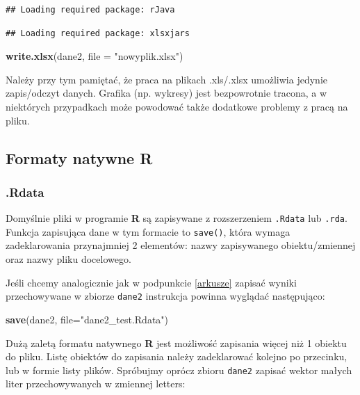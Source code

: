 \documentclass[]{book}
\newenvironment{Shaded}{\begin{snugshade}}{\end{snugshade}}
\newcommand{\KeywordTok}[1]{\textcolor[rgb]{0.13,0.29,0.53}{\textbf{#1}}}
\newcommand{\DataTypeTok}[1]{\textcolor[rgb]{0.13,0.29,0.53}{#1}}
\newcommand{\StringTok}[1]{\textcolor[rgb]{0.31,0.60,0.02}{#1}}
\newcommand{\NormalTok}[1]{#1}
\theoremstyle{definition}
\theoremstyle{definition}
\theoremstyle{definition}
\theoremstyle{remark}
\begin{document}
\begin{verbatim}
## Loading required package: rJava
\end{verbatim}

\begin{verbatim}
## Loading required package: xlsxjars
\end{verbatim}

\begin{Shaded}
\begin{Highlighting}[]
\KeywordTok{write.xlsx}\NormalTok{(dane2, }\DataTypeTok{file =} \StringTok{"nowyplik.xlsx"}\NormalTok{)}
\end{Highlighting}
\end{Shaded}

Należy przy tym pamiętać, że praca na plikach .xls/.xlsx umożliwia
jedynie zapis/odczyt danych. Grafika (np. wykresy) jest bezpowrotnie
tracona, a w niektórych przypadkach może powodować także dodatkowe
problemy z pracą na pliku.

\subsection{\texorpdfstring{Formaty natywne
\textbf{R}}{Formaty natywne R}}\label{formaty-natywne-r}

\subsubsection{.Rdata}\label{rdata}

Domyślnie pliki w programie \textbf{R} są zapisywane z rozszerzeniem
\texttt{.Rdata} lub \texttt{.rda}. Funkcja zapisująca dane w tym
formacie to \texttt{save()}, która wymaga zadeklarowania przynajmniej 2
elementów: nazwy zapisywanego obiektu/zmiennej oraz nazwy pliku
docelowego.

Jeśli chcemy analogicznie jak w podpunkcie \ref{arkusze} zapisać wyniki
przechowywane w zbiorze \texttt{dane2} instrukcja powinna wyglądać
następująco:

\begin{Shaded}
\begin{Highlighting}[]
\KeywordTok{save}\NormalTok{(dane2, }\DataTypeTok{file=}\StringTok{"dane2_test.Rdata"}\NormalTok{)}
\end{Highlighting}
\end{Shaded}

Dużą zaletą formatu natywnego \textbf{R} jest możliwość zapisania więcej
niż 1 obiektu do pliku. Listę obiektów do zapisania należy zadeklarować
kolejno po przecinku, lub w formie listy plików. Spróbujmy oprócz zbioru
\texttt{dane2} zapisać wektor małych liter przechowywanych w zmiennej
letters:
\end{document}
